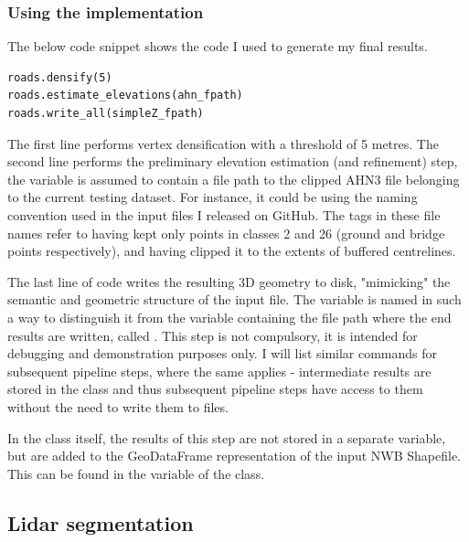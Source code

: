 \subsubsection{Using the implementation}

The below code snippet shows the code I used to generate my final results.

\begin{lstlisting}
roads.densify(5)
roads.estimate_elevations(ahn_fpath)
roads.write_all(simpleZ_fpath)
\end{lstlisting}

The first line performs vertex densification with a threshold of 5 metres. The second line performs the preliminary elevation estimation (and refinement) step, the variable  is assumed to contain a file path to the clipped AHN3 file belonging to the current testing dataset. For instance, it could be  using the naming convention used in the input files I released on GitHub. The tags  in these file names refer to having kept only points in classes 2 and 26 (ground and bridge points respectively), and having clipped it to the extents of buffered centrelines.

The last line of code writes the resulting 3D geometry to disk, "mimicking" the semantic and geometric structure of the input file. The variable is named in such a way to distinguish it from the variable containing the file path where the end results are written, called . This step is not compulsory, it is intended for debugging and demonstration purposes only. I will list similar commands for subsequent pipeline steps, where the same applies - intermediate results are stored in the class and thus subsequent pipeline steps have access to them without the need to write them to files.

In the class itself, the results of this step are not stored in a separate variable, but are added to the GeoDataFrame representation of the input NWB Shapefile. This can be found in the  variable of the  class.

\subsection{Lidar segmentation}
\label{sub:r_lidarsegmentation}

